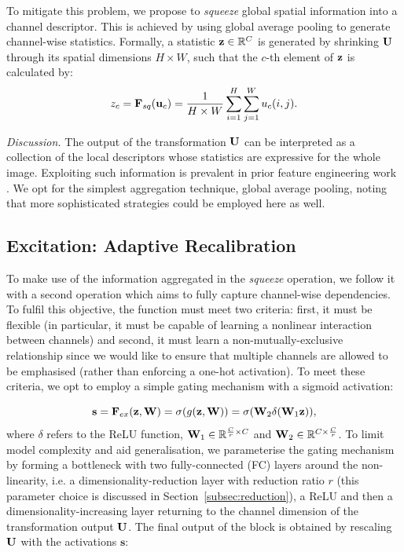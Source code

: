 To mitigate this problem, we propose to {\it squeeze} global spatial information into a channel descriptor. This is achieved by using global average pooling to generate channel-wise statistics. Formally, a statistic $\mathbf{z} \in \mathbb{R}^{C}$ is generated by shrinking $\mathbf{U}$ through its spatial dimensions $H \times W$, such that the $c$-th element of $\mathbf{z}$ is calculated by:
\begin{equation}\label{squeeze}
z_c = \mathbf{F}_{sq}(\mathbf{u}_c) = \frac{1}{H\times W}\sum_{i=1}^{H} \sum_{j=1}^{W} u_c(i,j).
\end{equation}

{\it Discussion.} The output of the transformation $\mathbf{U}$ can be interpreted as a collection of the local descriptors whose statistics are expressive for the whole image. Exploiting such information is prevalent in prior feature engineering work \cite{yang_cvpr2009spm, fisher_ijcv2013fv, shen_tip2015}. We opt for the simplest aggregation technique, global average pooling, noting that more sophisticated strategies could be employed here as well.

\subsection{Excitation: Adaptive Recalibration} \label{subsec:adaptive-recal}
To make use of the information aggregated in the \textit{squeeze} operation, we follow it with a second operation which aims to fully capture channel-wise dependencies.  To fulfil this objective, the function must meet two criteria: first, it must be flexible (in particular, it must be capable of learning a nonlinear interaction between channels) and second, it must learn a non-mutually-exclusive relationship since we would like to ensure that multiple channels are allowed to be emphasised (rather than enforcing a one-hot activation). To meet these criteria, we opt to employ a simple gating mechanism with a sigmoid activation:

\begin{equation}\label{excitation}
\mathbf{s} = \mathbf{F}_{ex}(\mathbf{z}, \mathbf{W}) = \sigma(g(\mathbf{z}, \mathbf{W})) = \sigma(\mathbf{W}_2\delta(\mathbf{W}_1\mathbf{z})),
\end{equation}
where $\delta$ refers to the ReLU \cite{nair_icml2010relu} function, $\mathbf{W}_1 \in \mathbb{R}^{\frac{C}{r} \times C}$ and $\mathbf{W}_2 \in \mathbb{R}^{C \times \frac{C}{r}}$. To limit model complexity and aid generalisation, we parameterise the gating mechanism by forming a bottleneck with two fully-connected (FC) layers around the non-linearity, i.e. a dimensionality-reduction layer with reduction ratio $r$ (this parameter choice is discussed in Section~\ref{subsec:reduction}), a ReLU and then a dimensionality-increasing layer returning to the channel dimension of the transformation output $\mathbf{U}$. The final output of the block is obtained by rescaling $\mathbf{U}$ with the activations $\mathbf{s}$:

